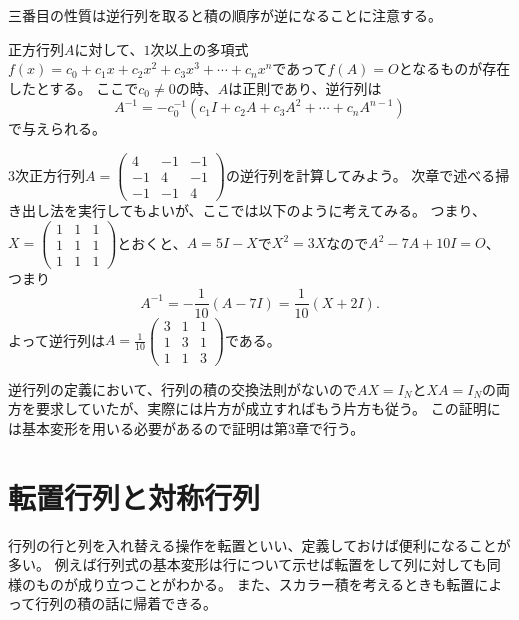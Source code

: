 三番目の性質は逆行列を取ると積の順序が逆になることに注意する。

\begin{theorem}
正方行列$A$に対して、$1$次以上の多項式$f(x) = c_0+c_1 x+c_2 x^2+c_3 x^3+\cdots+c_n x^n$であって$f(A) = O$となるものが存在したとする。
ここで$c_0 \ne 0$の時、$A$は正則であり、逆行列は
$$
A^{-1} = -c_0^{-1}(c_1 I+c_2 A+c_3 A^2+\cdots+c_n A^{n-1})
$$
で与えられる。
\end{theorem}

\begin{example}
$3$次正方行列$A = \begin{pmatrix}4 & -1 & -1 \\ -1 & 4 & -1 \\ -1 & -1 & 4\end{pmatrix}$の逆行列を計算してみよう。
次章で述べる掃き出し法を実行してもよいが、ここでは以下のように考えてみる。
つまり、$X = \begin{pmatrix}1 & 1 & 1 \\ 1 & 1 & 1 \\ 1 & 1 & 1\end{pmatrix}$とおくと、$A = 5 I-X$で$X^2 = 3 X$なので$A^2-7 A+10 I = O$、つまり
$$
A^{-1} = -\frac{1}{10}(A-7 I) = \frac{1}{10}(X+2 I).
$$
よって逆行列は$A = \frac{1}{10}\begin{pmatrix}3 & 1 & 1 \\ 1 & 3 & 1 \\ 1 & 1 & 3\end{pmatrix}$である。
\end{example}

逆行列の定義において、行列の積の交換法則がないので$A X = I_N$と$X A = I_N$の両方を要求していたが、実際には片方が成立すればもう片方も従う。
この証明には基本変形を用いる必要があるので証明は第3章で行う。

\section{転置行列と対称行列}

行列の行と列を入れ替える操作を転置といい、定義しておけば便利になることが多い。
例えば行列式の基本変形は行について示せば転置をして列に対しても同様のものが成り立つことがわかる。
また、スカラー積を考えるときも転置によって行列の積の話に帰着できる。

